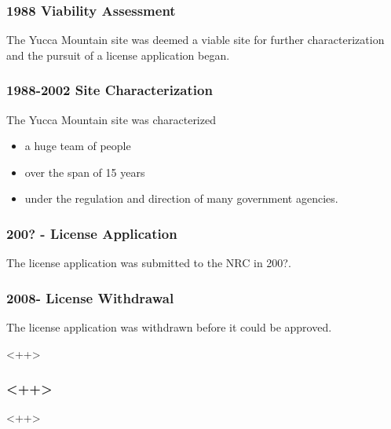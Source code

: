 
\begin{frame}[ctb!]
    \frametitle{1988 Viability Assessment}
    The Yucca Mountain site was deemed a viable site for further 
    characterization and the pursuit of a license application began. 

  \end{frame}

\begin{frame}[ctb!]
    \frametitle{1988-2002 Site Characterization}
    The Yucca Mountain site was characterized 
    \begin{itemize}
      \item a huge team of people 
      \item over the span of 15 years
      \item under the regulation and direction of many government agencies.
    \end{itemize}
  \end{frame}


\begin{frame}[ctb!]
    \frametitle{200? - License Application}
    The license application was submitted to the NRC in 200?.
  \end{frame}

\begin{frame}[ctb!]
    \frametitle{2008- License Withdrawal}
    The license application was withdrawn before it could be approved.
  \end{frame}<++>

\begin{frame}[<+ctb!+>]
    \frametitle{<++>}
  \end{frame}<++>


